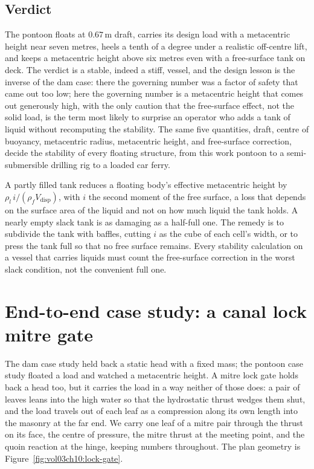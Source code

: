 

\subsection{Verdict}

The pontoon floats at $0.67\,\si{\meter}$ draft, carries its design load
with a metacentric height near seven metres, heels a tenth of a degree
under a realistic off-centre lift, and keeps a metacentric height above
six metres even with a free-surface tank on deck. The verdict is a stable,
indeed a stiff, vessel, and the design lesson is the inverse of the dam
case: there the governing number was a factor of safety that came out too
low; here the governing number is a metacentric height that comes out
generously high, with the only caution that the free-surface effect, not
the solid load, is the term most likely to surprise an operator who adds a
tank of liquid without recomputing the stability. The same five
quantities, draft, centre of buoyancy, metacentric radius, metacentric
height, and free-surface correction, decide the stability of every
floating structure, from this work pontoon to a semi-submersible drilling
rig to a loaded car ferry.

\begin{principle}
A partly filled tank reduces a floating body's effective metacentric
height by $\rho_l\, i/(\rho_f V_{\text{disp}})$, with $i$ the second moment
of the free surface, a loss that depends on the surface area of the liquid
and not on how much liquid the tank holds. A nearly empty slack tank is as
damaging as a half-full one. The remedy is to subdivide the tank with
baffles, cutting $i$ as the cube of each cell's width, or to press the tank
full so that no free surface remains. Every stability calculation on a
vessel that carries liquids must count the free-surface correction in the
worst slack condition, not the convenient full one.
\end{principle}

\section{End-to-end case study: a canal lock mitre gate}

The dam case study held back a static head with a fixed mass; the pontoon
case study floated a load and watched a metacentric height. A mitre lock
gate holds back a head too, but it carries the load in a way neither of
those does: a pair of leaves leans into the high water so that the
hydrostatic thrust wedges them shut, and the load travels out of each leaf
as a compression along its own length into the masonry at the far end. We
carry one leaf of a mitre pair through the thrust on its face, the centre
of pressure, the mitre thrust at the meeting point, and the quoin reaction
at the hinge, keeping numbers throughout. The plan geometry is
Figure~\ref{fig:vol03ch10:lock-gate}.

